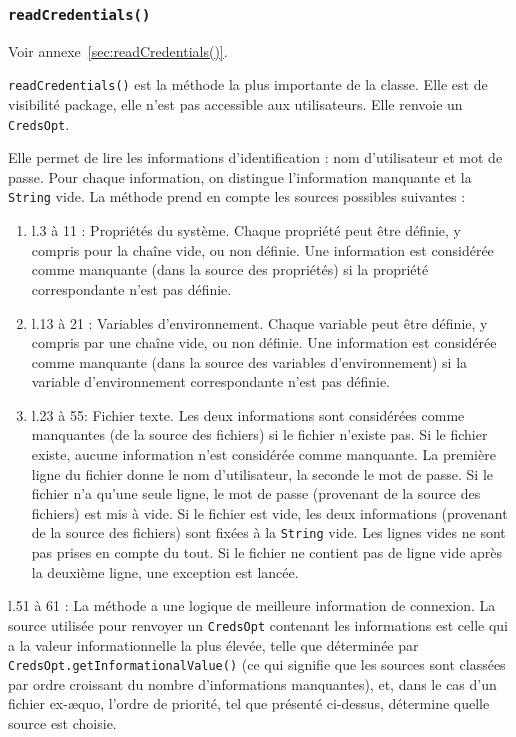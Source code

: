 \subsubsection{\texttt{readCredentials()}}
Voir annexe~\ref{sec:readCredentials()}.

\texttt{readCredentials()} est la méthode la plus importante de la classe. Elle est de visibilité package, elle n'est pas accessible aux utilisateurs. Elle renvoie un \texttt{CredsOpt}.

Elle permet de lire les informations d'identification : nom d'utilisateur et mot de passe. Pour chaque information, on distingue l'information manquante et la \texttt{String} vide. La méthode prend en compte les sources possibles suivantes :

\begin{enumerate}
    \item l.3 à 11 : Propriétés du système. Chaque propriété peut être définie, y compris pour la chaîne vide, ou non définie. Une information est considérée comme manquante (dans la source des propriétés) si la propriété correspondante n'est pas définie.
    \item l.13 à 21 : Variables d'environnement. Chaque variable peut être définie, y compris par une chaîne vide, ou non définie. Une information est considérée comme manquante (dans la source des variables d'environnement) si la variable d'environnement correspondante n'est pas définie.
    \item l.23 à 55: Fichier texte. Les deux informations sont considérées comme manquantes (de la source des fichiers) si le fichier n'existe pas. Si le fichier existe, aucune information n'est considérée comme manquante. La première ligne du fichier donne le nom d'utilisateur, la seconde le mot de passe. Si le fichier n'a qu'une seule ligne, le mot de passe (provenant de la source des fichiers) est mis à vide. Si le fichier est vide, les deux informations (provenant de la source des fichiers) sont fixées à la \texttt{String} vide. Les lignes vides ne sont pas prises en compte du tout. Si le fichier ne contient pas de ligne vide après la deuxième ligne, une exception est lancée.
\end{enumerate}
l.51 à 61 : La méthode a une logique de meilleure information de connexion. La source utilisée pour renvoyer un \texttt{CredsOpt} contenant les informations est celle qui a la valeur informationnelle la plus élevée, telle que déterminée par \texttt{CredsOpt.getInformationalValue()} (ce qui signifie que les sources sont classées par ordre croissant du nombre d'informations manquantes), et, dans le cas d'un fichier ex-\ae quo, l'ordre de priorité, tel que présenté ci-dessus, détermine quelle source est choisie.

